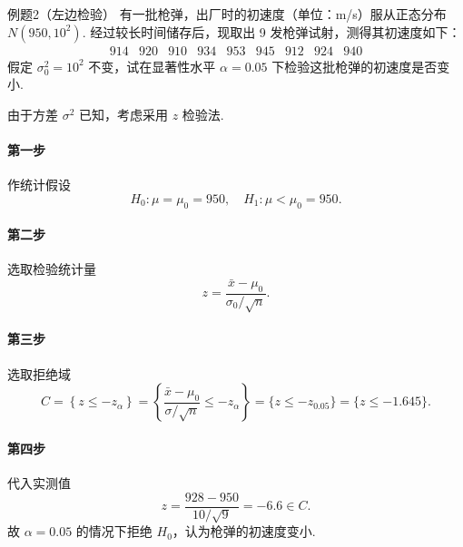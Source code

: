 \begin{question}{例题2（左边检验）}
    有一批枪弹，出厂时的初速度（单位：m/s）服从正态分布 $N(950, 10^2)$. 经过较长时间储存后，现取出 9 发枪弹试射，测得其初速度如下：
    $$
        \begin{array}{ccccccccc}
            914 & 920 & 910 & 934 & 953 & 945 & 912 & 924 & 940
        \end{array}
    $$
    假定 $\sigma_0^2=10^2$ 不变，试在显著性水平 $\alpha=0.05$ 下检验这批枪弹的初速度是否变小.
\end{question}
\begin{solution}
    由于方差 $\sigma^2$ 已知，考虑采用 $z$ 检验法.
    \paragraph{第一步} 作统计假设
    $$
        H_0: \mu=\mu_0=950, \quad H_1: \mu<\mu_0=950.
    $$
    \paragraph{第二步} 选取检验统计量
    $$
        z = \frac{\bar{x}-\mu_0}{\sigma_0/\sqrt{n}} .
    $$
    \paragraph{第三步} 选取拒绝域
    $$
        C = \left\{z \leqslant -z_{\alpha}\right\}
        = \left\{\frac{\bar{x}-\mu_0}{\sigma/\sqrt{n}} \leqslant -z_{\alpha}\right\}
        = \{z \leqslant -z_{0.05}\}
        = \{z \leqslant -1.645\}.
    $$
    \paragraph{第四步} 代入实测值
    $$
        z = \frac{928-950}{10/\sqrt{9}} = -6.6 \in C.
    $$
    故 $\alpha = 0.05$ 的情况下拒绝 $H_0$，认为枪弹的初速度变小.
\end{solution}



